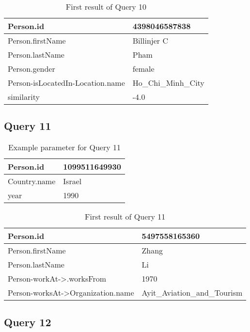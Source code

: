 \begin{table}[H]
    \begin{tabular}{|p{8cm}|p{8cm}|}
        \hline
        Person.id & 4398046587838 \\
        \hline
        Person.firstName & Billinjer C  \\
        \hline
        Person.lastName & Pham  \\
        \hline
        Person.gender & female \\
        \hline
        Person-isLocatedIn-Location.name & Ho\_Chi\_Minh\_City \\
        \hline
        similarity & -4.0 \\
        \hline
    \end{tabular}
    \caption{First result of Query 10}
\end{table}

\subsection{Query 11}

\begin{table}[H]
    \begin{tabular}{|l|l|}
        \hline
        Person.id &1099511649930  \\
        \hline
        Country.name &  Israel \\
        \hline
        year & 1990 \\
        \hline
    \end{tabular}
    \caption{Example parameter for Query 11}
\end{table}

\begin{table}[H]
    \begin{tabular}{|p{8cm}|p{8cm}|}
        \hline
        Person.id & 5497558165360  \\
        \hline
        Person.firstName & Zhang  \\
        \hline
        Person.lastName & Li  \\
        \hline
        Person-workAt->.worksFrom & 1970  \\
        \hline
        Person-worksAt->Organization.name & Ayit\_Aviation\_and\_Tourism \\
        \hline
    \end{tabular}
    \caption{First result of Query 11}
\end{table}

\subsection{Query 12}


